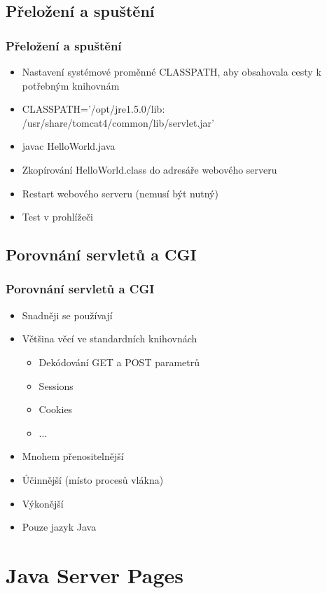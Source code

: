 \documentclass{beamer}
\begin{document}
\subsection{Přeložení a spuštění}

\begin{frame}
  \frametitle{Přeložení a spuštění}
    \begin{itemize}
      \item Nastavení systémové proměnné CLASSPATH, aby obsahovala cesty k potřebným knihovnám
      \item CLASSPATH='/opt/jre1.5.0/lib:\\/usr/share/tomcat4/common/lib/servlet.jar'
      \item javac HelloWorld.java
      \item Zkopírování HelloWorld.class do adresáře webového serveru
      \item Restart webového serveru (nemusí být nutný)
      \item Test v prohlížeči
    \end{itemize}
\end{frame}


\subsection*{Porovnání servletů a CGI}

\begin{frame}
  \frametitle{Porovnání servletů a CGI}
    \begin{itemize}
      \item Snadněji se používají
      \item Většina věcí ve standardních knihovnách
      \begin{itemize}
        \item Dekódování GET a POST parametrů
        \item Sessions
        \item Cookies
        \item ...
      \end{itemize}
      \item Mnohem přenositelnější
      \item Účinnější (místo procesů vlákna)
      \item Výkonější
      \item Pouze jazyk Java
    \end{itemize}
\end{frame}


\section{Java Server Pages}
\end{document}
